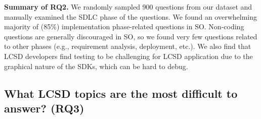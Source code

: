 \begin{tcolorbox}[flushleft upper,boxrule=1pt,arc=0pt,left=0pt,right=0pt,top=0pt,bottom=0pt,colback=white,after=\ignorespacesafterend\par\noindent]
\noindent\textbf{Summary of RQ2.} We 
randomly sampled 900 questions from our dataset and manually examined the SDLC phase of the questions. We found an overwhelming majority of (85\%) implementation phase-related questions in SO. Non-coding questions are generally discouraged in SO, so we found very few questions related to other phases (e.g., requirement analysis, deployment, etc.). We also find that LCSD developers find testing to be challenging for LCSD application due to the graphical nature of the SDKs, which can be hard to debug.
\end{tcolorbox}


\subsection{What LCSD topics are the most difficult to answer? (RQ3)}\label{sec:rq-topic-difficulty}

